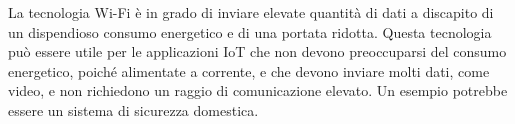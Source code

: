 \noindent La tecnologia Wi-Fi è in grado di inviare elevate quantità di dati a discapito di un dispendioso consumo energetico e di una portata ridotta. Questa tecnologia può essere utile per le applicazioni IoT che non devono preoccuparsi del consumo energetico, poiché alimentate a corrente, e che devono inviare molti dati, come video, e non richiedono un raggio di comunicazione elevato. Un esempio potrebbe essere un sistema di sicurezza domestica.
